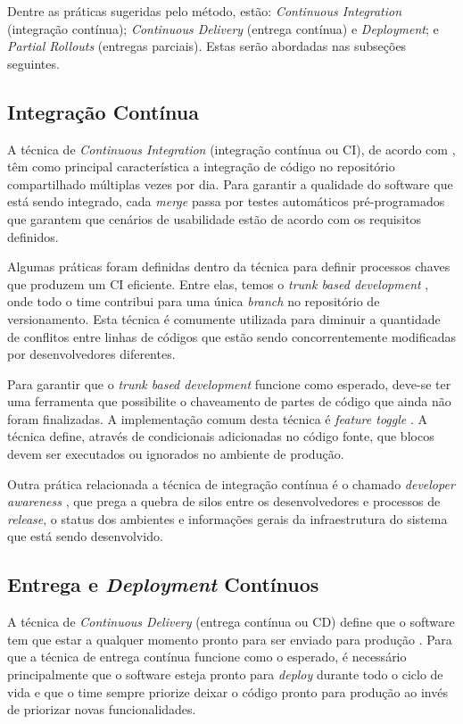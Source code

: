 Dentre as práticas sugeridas pelo método, estão: \emph{Continuous Integration} (integração contínua);  \emph{Continuous Delivery} (entrega contínua) e \emph{Deployment}; e \emph{Partial Rollouts} (entregas parciais). Estas serão abordadas nas subseções seguintes.

\subsection{Integração Contínua}

A técnica de \emph{Continuous Integration} (integração contínua ou CI), de acordo com \cite{fowlerCI}, têm como principal característica a integração de código no repositório compartilhado múltiplas vezes por dia. Para garantir a qualidade do software que está sendo integrado, cada \emph{merge} passa por testes automáticos pré-programados que garantem que cenários de usabilidade estão de acordo com os requisitos definidos. 

Algumas práticas foram definidas dentro da técnica para definir processos chaves que produzem um CI eficiente. Entre elas, temos o \emph{trunk based development} \cite{devAndDeploymentFB}, onde todo o time contribui para uma única \emph{branch} no repositório de versionamento. Esta técnica é comumente utilizada para diminuir a quantidade de conflitos entre linhas de códigos que estão sendo concorrentemente modificadas por desenvolvedores diferentes. 

Para garantir que o \emph{trunk based development} funcione como esperado, deve-se ter uma ferramenta que possibilite o chaveamento de partes de código que ainda não foram finalizadas. A implementação comum desta técnica é \emph{feature toggle} \cite{featureToggles}. A técnica define, através de condicionais adicionadas no código fonte, que blocos devem ser executados ou ignorados no ambiente de produção.

Outra prática relacionada a técnica de integração contínua é o chamado \emph{developer awareness} \cite{awa}, que prega a quebra de silos entre os desenvolvedores e processos de \emph{release}, o status dos ambientes e informações gerais da infraestrutura do sistema que está sendo desenvolvido.

\subsection{Entrega e \emph{Deployment} Contínuos}

A técnica de \emph{Continuous Delivery} (entrega contínua ou CD) define que o software tem que estar a qualquer momento pronto para ser enviado para produção \cite{fowlerCD}. Para que a técnica de entrega contínua funcione como o esperado, é necessário principalmente que o software esteja pronto para \emph{deploy} durante todo o ciclo de vida e que o time sempre priorize deixar o código pronto para produção ao invés de priorizar novas funcionalidades.

